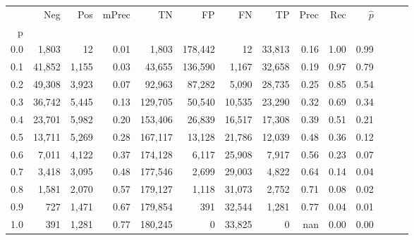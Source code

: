 \begin{tabular}{rrrrrrrrrrrrrr}
\toprule
{} &     Neg &    Pos & mPrec &       TN &       FP &      FN &      TP &  Prec &   Rec & $\hat{p}$ \\
p   &         &        &       &          &          &         &         &       &       &           \\
\midrule
0.0 &   1,803 &     12 &  0.01 &    1,803 &  178,442 &      12 &  33,813 &  0.16 &  1.00 &      0.99 \\
0.1 &  41,852 &  1,155 &  0.03 &   43,655 &  136,590 &   1,167 &  32,658 &  0.19 &  0.97 &      0.79 \\
0.2 &  49,308 &  3,923 &  0.07 &   92,963 &   87,282 &   5,090 &  28,735 &  0.25 &  0.85 &      0.54 \\
0.3 &  36,742 &  5,445 &  0.13 &  129,705 &   50,540 &  10,535 &  23,290 &  0.32 &  0.69 &      0.34 \\
0.4 &  23,701 &  5,982 &  0.20 &  153,406 &   26,839 &  16,517 &  17,308 &  0.39 &  0.51 &      0.21 \\
0.5 &  13,711 &  5,269 &  0.28 &  167,117 &   13,128 &  21,786 &  12,039 &  0.48 &  0.36 &      0.12 \\
0.6 &   7,011 &  4,122 &  0.37 &  174,128 &    6,117 &  25,908 &   7,917 &  0.56 &  0.23 &      0.07 \\
0.7 &   3,418 &  3,095 &  0.48 &  177,546 &    2,699 &  29,003 &   4,822 &  0.64 &  0.14 &      0.04 \\
0.8 &   1,581 &  2,070 &  0.57 &  179,127 &    1,118 &  31,073 &   2,752 &  0.71 &  0.08 &      0.02 \\
0.9 &     727 &  1,471 &  0.67 &  179,854 &      391 &  32,544 &   1,281 &  0.77 &  0.04 &      0.01 \\
1.0 &     391 &  1,281 &  0.77 &  180,245 &        0 &  33,825 &       0 &   nan &  0.00 &      0.00 \\
\bottomrule
\end{tabular}
